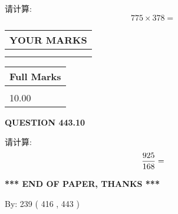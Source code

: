 \documentclass{ctexart}
\begin{document}
  
 
请计算:
\begin{equation}
775  \times    %
378 = \nonumber
\end{equation}
 

 

 
  
\vspace{0.2in}
  
\noindent\begin{tabular}{|l|}
\hline
 YOUR MARKS  \\
\hline
 \\ 
 \\ 
\hline
\end{tabular}
\hspace{0.05in} \begin{tabular}{|l|}
\hline
 Full Marks  \\
\hline
 \\ 
10.00 \\
\hline
\end{tabular}
{\textbf{\Large{QUESTION
443.10 
}}}
  
  
 
请计算:
\begin{equation}
\frac { %
925 }  {  %
168} = \nonumber
\end{equation}
 

 

 
   
   
 \vspace{0.2in}
 
   
   
   
   
\vspace{1.0in} 
{\textbf{\large{ *** END OF PAPER, THANKS *** }}} 
   
   
\hspace{1.0in} By: 
 239 ( 416 ,  443 )
   
   
 
 
\end{document}
